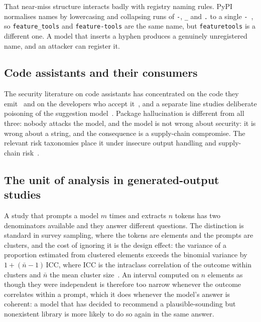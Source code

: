 \documentclass[journal]{IEEEtran}
\providecommand{\citep}[1]{\cite{#1}}
\theoremstyle{definition}
\begin{document}
That near-miss structure interacts badly with registry naming rules. PyPI
normalises names by lowercasing and collapsing runs of \texttt{-},
\texttt{\_} and \texttt{.} to a single \texttt{-}~\citep{pep503, pep508}, so
\texttt{feature\_tools} and \texttt{feature-tools} are the same name, but
\texttt{featuretools} is a different one. A model that inserts a hyphen produces
a genuinely unregistered name, and an attacker can register it.

\subsection{Code assistants and their consumers}

The security literature on code assistants has concentrated on the code they
emit~\citep{chen2021codex, pearce2022asleep, bhatt2023cyberseceval} and on the
developers who accept it~\citep{perry2023insecure, sandoval2023lostatc}, and a
separate line studies deliberate poisoning of the suggestion
model~\citep{schuster2021autocomplete, aghakhani2024trojanpuzzle}. Package
hallucination is different from all three: nobody attacks the model, and the
model is not wrong about security: it is wrong about a string, and the
consequence is a supply-chain compromise. The relevant risk taxonomies place it
under insecure output handling and supply-chain
risk~\citep{owasp2025llm, vassilev2023aml}.

\subsection{The unit of analysis in generated-output studies}

A study that prompts a model $m$ times and extracts $n$ tokens has two
denominators available and they answer different questions. The distinction is
standard in survey sampling, where the tokens are elements and the prompts are
clusters, and the cost of ignoring it is the design effect: the variance of a
proportion estimated from clustered elements exceeds the binomial variance by
$1+(\bar{n}-1)\,\mathrm{ICC}$, where $\mathrm{ICC}$ is the intraclass
correlation of the outcome within clusters and $\bar{n}$ the mean cluster
size~\citep{kish1965survey, killip2004icc, donner2000cluster}. An interval
computed on $n$ elements as though they were independent is therefore too
narrow whenever the outcome correlates within a prompt, which it does whenever
the model's answer is coherent: a model that has decided to recommend a
plausible-sounding but nonexistent library is more likely to do so again in the
same answer.
\end{document}
